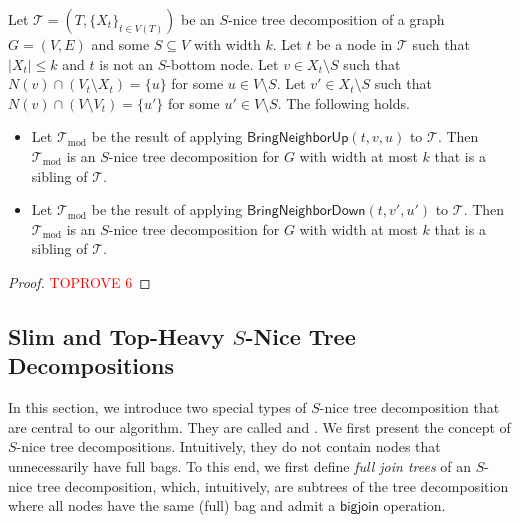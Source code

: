 \documentclass[a4paper,UKenglish,cleveref, autoref, thm-restate, numberwithinsect]{lipics-v2021}
\newcounter{algorithm}
\newcommand{\bigjoin}{\mathsf{bigjoin}}
\newcommand{\slim}{\text{slim}\xspace}
\newcommand{\topheavy}{\text{top-heavy}\xspace}
\newcommand{\BringNeighborUp}{\mathsf{BringNeighborUp}}
\newcommand{\BringNeighborDown}{\mathsf{BringNeighborDown}}
\begin{document}
 \begin{observation} \label{lem:bringupdown}
     Let $\mathcal{T}=(T,\{X_t\}_{t\in V(T)})$ be an $S$-nice tree decomposition of a graph $G=(V,E)$ and some $S\subseteq V$ with width $k$. Let $t$ be a node in $\mathcal{T}$ such that $|X_t|\le k$ and $t$ is not an $S$-bottom node. Let $v\in X_t\setminus S$ such that $N(v)\cap (V_t\setminus X_t)=\{u\}$ for some $u\in V\setminus S$.
     Let $v'\in X_t\setminus S$ such that $N(v)\cap (V\setminus V_t)=\{u'\}$ for some $u'\in V\setminus S$. The following holds.
     \begin{itemize}
     \item Let $\mathcal{T}_{\text{mod}}$ be the result of applying $\BringNeighborUp(t, v, u)$ to $\mathcal{T}$. Then $\mathcal{T}_{\text{mod}}$ is an $S$-nice tree decomposition for $G$ with width at most $k$ that is a sibling of $\mathcal{T}$.
     \item Let $\mathcal{T}_{\text{mod}}$ be the result of applying $\BringNeighborDown(t, v', u')$ to $\mathcal{T}$. Then $\mathcal{T}_{\text{mod}}$ is an $S$-nice tree decomposition for $G$ with width at most $k$ that is a sibling of $\mathcal{T}$.
     \end{itemize}
 \end{observation}
 \begin{proof}\textcolor{red}{TOPROVE 6}\end{proof}

\subsection{Slim and Top-Heavy \boldmath$S$-Nice Tree Decompositions}
\label{sec:useful}

In this section, we introduce two special types of $S$-nice tree decomposition that are central to our algorithm. They are called \emph{\slim} and \emph{\topheavy}.  We first present the concept of \slim $S$-nice tree decompositions. Intuitively, they do not contain nodes that unnecessarily have full bags. To this end, we first define \emph{full join trees} of an $S$-nice tree decomposition, which, intuitively, are subtrees of the tree decomposition where all nodes have the same (full) bag and admit a $\bigjoin$ operation.
\end{document}
